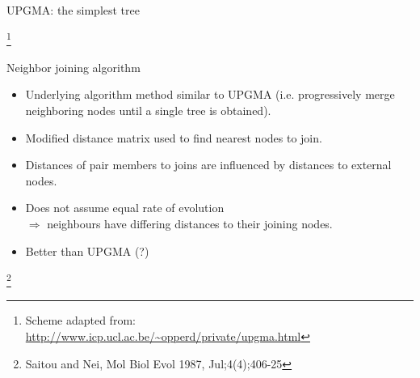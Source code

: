 \documentclass[pdf]{beamer}
\newcommand\blfootnote[1]{%
  \begingroup  %
  \renewcommand\thefootnote{}\footnote{#1}%
  \addtocounter{footnote}{-1}  %
  \endgroup
}
\begin{document}
\begin{frame}{UPGMA: the simplest tree}
\begin{figure}[ht]
 \end{figure}
  \blfootnote{Scheme adapted from:\\
    \url{http://www.icp.ucl.ac.be/~opperd/private/upgma.html}
  }
\end{frame}

\begin{frame}{Neighbor joining algorithm}
  \begin{itemize}
  \item Underlying algorithm method similar to UPGMA (i.e. progressively merge
    neighboring nodes until a single tree is obtained).
  \item Modified distance matrix used to find nearest nodes to join.
  \item Distances of pair members to joins are influenced by distances to external nodes.
  \item Does not assume equal rate of evolution\\ $\Rightarrow$ neighbours have
    differing distances to their joining nodes.
  \item Better than UPGMA (?)
  \end{itemize}
\blfootnote{Saitou and Nei, Mol Biol Evol 1987, Jul;4(4);406-25}  
\end{frame}
\end{document}
